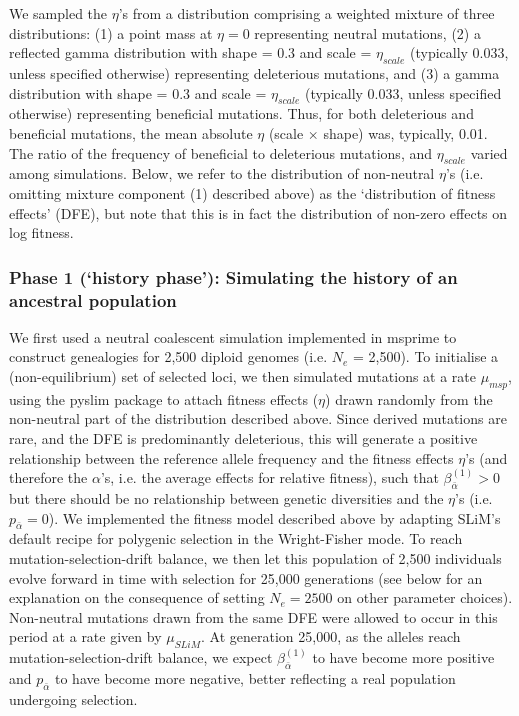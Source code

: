\documentclass[12pt]{article}
\begin{document}
\begin{bibunit}
We sampled the $\eta$'s from a distribution comprising a weighted mixture of three distributions: (1) a point mass at $\eta = 0$ representing neutral mutations, (2) a reflected gamma distribution with shape = 0.3 and scale = $\eta_{scale}$ (typically 0.033, unless specified otherwise) representing deleterious mutations, and (3) a gamma distribution with shape = 0.3 and scale = $\eta_{scale}$ (typically 0.033, unless specified otherwise) representing beneficial mutations. Thus, for both deleterious and beneficial mutations, the mean absolute $\eta$ (scale $\times$ shape) was, typically, 0.01. The ratio of the frequency of beneficial to deleterious mutations, and $\eta_{scale}$ varied among simulations. Below, we refer to the distribution of non-neutral $\eta$'s (i.e. omitting mixture component (1) described above) as the `distribution of fitness effects' (DFE), but note that this is in fact the distribution of non-zero effects on log fitness.   


\subsubsection*{Phase 1 (`history phase'): Simulating the history of an ancestral population}

We first used a neutral coalescent simulation implemented in msprime \citep{kelleher2016efficient} to construct genealogies for 2,500 diploid genomes (i.e. $N_e$ = 2,500). To initialise a (non-equilibrium) set of selected loci, we then simulated mutations at a rate $\mu_{msp}$, using the pyslim package to attach fitness effects ($\eta$) drawn randomly from the non-neutral part of the distribution described above. Since derived mutations are rare, and the DFE is predominantly deleterious, this will generate a positive relationship between the reference allele frequency and the fitness effects $\eta$'s (and therefore the $\alpha$'s, i.e. the average effects for relative fitness), such that $\beta^{(1)}_{\bar \alpha} >0$ but there should be no relationship between genetic diversities and the $\eta$'s (i.e. $p_{\bar \alpha} = 0$). We implemented the fitness model described above by adapting SLiM's \citep{haller2023slim} default recipe for polygenic selection in the Wright-Fisher mode. To reach mutation-selection-drift balance,  we then let this population of 2,500 individuals evolve forward in time with selection for 25,000 generations (see below for an explanation on the consequence of setting $N_e = 2500$ on other parameter choices). Non-neutral mutations drawn from the same DFE were allowed to occur in this period at a rate given by $\mu_{SLiM}$.  At generation 25,000, as the alleles reach mutation-selection-drift balance, we expect $\beta^{(1)}_{\bar \alpha}$ to have become more positive and $p_{\bar \alpha}$ to have become more negative, better reflecting a real population undergoing selection. 


\end{bibunit}
\end{document}
